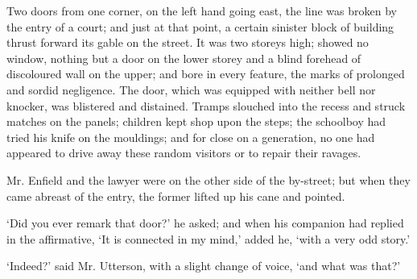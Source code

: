 \documentclass[]{novel}
\begin{document}
Two doors from one corner, on the left hand going east, the line was broken by the entry of a court; and just at that point, a certain sinister block of building thrust forward its gable on the street. It was two storeys high; showed no window, nothing but a door on the lower storey and a blind forehead of discoloured wall on the upper; and bore in every feature, the marks of prolonged and sordid negligence. The door, which was equipped with neither bell nor knocker, was blistered and distained. Tramps slouched into the recess and struck matches on the panels; children kept shop upon the steps; the schoolboy had tried his knife on the mouldings; and for close on a generation, no one had appeared to drive away these random visitors or to repair their ravages.

Mr. Enfield and the lawyer were on the other side of the by-street; but when they came abreast of the entry, the former lifted up his cane and pointed.

‘Did you ever remark that door?’ he asked; and when his companion had replied in the affirmative, ‘It is connected in my mind,’ added he, ‘with a very odd story.’

‘Indeed?’ said Mr. Utterson, with a slight change of voice, ‘and what was that?’
\end{document}
